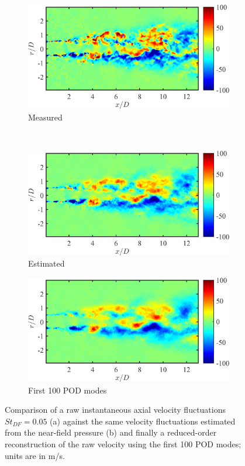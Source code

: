 \begin{figure}
	\centering
	\begin{subfigure}{0.75\textwidth}
		\centering
		\includegraphics[width=0.95\linewidth]{Figures/ch4_Ux_true_v2.png}
		\caption{Measured}
	\end{subfigure}\\
	\begin{subfigure}{0.75\textwidth}
		\centering
		\includegraphics[width=0.95\linewidth]{Figures/ch4_Ux_estimated_v2.png}
		\caption{Estimated}
	\end{subfigure}
	\begin{subfigure}{0.75\textwidth}
		\centering
		\includegraphics[width=0.95\linewidth]{Figures/ch4_Ux_POD100_v2.png}
		\caption{First 100 POD modes}
	\end{subfigure}
	\caption{Comparison of a raw instantaneous axial velocity fluctuations $St_{DF} =0.05$ (a) against the same velocity fluctuations estimated from the near-field pressure (b) and finally a reduced-order reconstruction of the raw velocity using the first 100 POD modes; units are in m/s.}
	\label{fig:ch4_SEPOD_filtering}
\end{figure}

